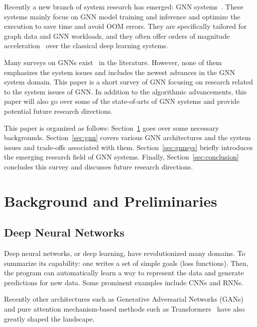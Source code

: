 Recently a new branch of system research has emerged: GNN systems~\cite{dgl}. These systems mainly focus on GNN model training and inference and optimize the execution to save time and avoid OOM errors. They are specifically tailored for graph data and GNN workloads, and they often offer orders of magnitude acceleration~\cite{dgl, pyg} over the classical deep learning systems.

Many surveys on GNNs exist~\cite{compsurvey, yannsurvey, zhousurvey} in the literature. However, none of them emphasizes the system issues and includes the newest advances in the GNN system domain. This paper is a short survey of GNN focusing on research related to the system issues of GNN. In addition to the algorithmic advancements, this paper will also go over some of the state-of-arts of GNN systems and provide potential future research directions. 

This paper is organized as follows: Section~\ref{sec:background} goes over some necessary backgrounds. Section~\ref{sec:gnn} covers various GNN architectures and the system issues and trade-offs associated with them. Section~\ref{sec:gnnsys} briefly introduces the emerging research field of GNN systems. Finally, Section~\ref{sec:conclusion} concludes this survey and discusses future research directions. 



\vspace{-2mm}
\section{Background and Preliminaries}
\label{sec:background}
\subsection{Deep Neural Networks}
Deep neural networks, or deep learning, have revolutionized many domains. To summarize its capability: one writes a set of simple goals (loss functions). Then, the program can automatically learn a way to represent the data and generate predictions for new data. Some prominent examples include CNNs\cite{cnn2} and RNNs\cite{rnn}. 

Recently other architectures such as Generative Adversarial Networks (GANs)~\cite{gan} and pure attention mechanism-based methods such as Transformers~\cite{transformer} have also greatly shaped the landscape. 

